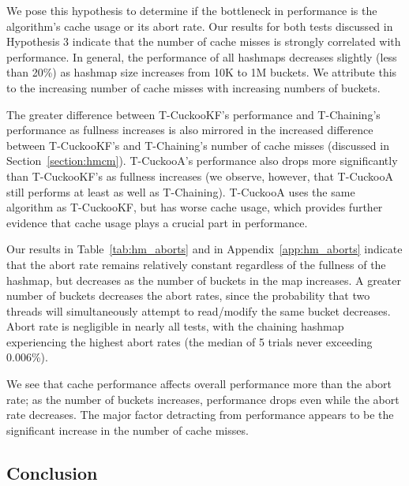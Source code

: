     We pose this hypothesis to determine if the bottleneck in performance is the algorithm's cache usage or its abort rate. 
Our results for both tests discussed in Hypothesis 3 indicate that the number of cache misses is strongly correlated with performance. In general, the performance of all hashmaps decreases slightly (less than 20\%) as hashmap size increases from 10K to 1M buckets. We attribute this to the increasing number of cache misses with increasing numbers of buckets.

The greater difference between T-CuckooKF's performance and T-Chaining's performance as fullness increases is also mirrored in the increased difference between T-CuckooKF's and T-Chaining's number of cache misses (discussed in Section~\ref{section:hmcm}). T-CuckooA's performance also drops more significantly than T-CuckooKF's as fullness increases (we observe, however, that T-CuckooA still performs at least as well as T-Chaining). T-CuckooA uses the same algorithm as T-CuckooKF, but has worse cache usage, which provides further evidence that cache usage plays a crucial part in performance. 

    Our results in Table~\ref{tab:hm_aborts} and in Appendix~\ref{app:hm_aborts} indicate that the abort rate remains relatively constant regardless of the fullness of the hashmap, but decreases as the number of buckets in the map increases. A greater number of buckets decreases the abort rates, since the probability that two threads will simultaneously attempt to read/modify the same bucket decreases. Abort rate is negligible in nearly all tests, with the chaining hashmap experiencing the highest abort rates (the median of 5 trials never exceeding 0.006\%).

We see that cache performance affects overall performance more than the abort rate; as the number of buckets increases, performance drops even while the abort rate decreases. The major factor detracting from performance appears to be the significant increase in the number of cache misses.

\vspace{12pt}
\noindent{}

\subsection{Conclusion}

